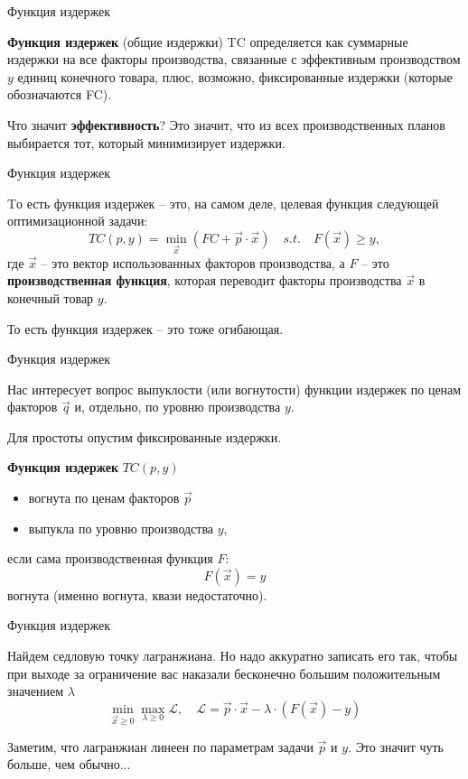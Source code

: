 \documentclass{beamer}
\begin{document}
\begin{frame}{Функция издержек}

\begin{definition}
\textbf{Функция издержек} (общие издержки) TC определяется как суммарные издержки на все факторы производства, связанные с эффективным производством $y$ единиц конечного товара, плюс, возможно, фиксированные издержки (которые обозначаются FC).
\end{definition}

Что значит \textbf{эффективность}? Это значит, что из всех производственных планов выбирается тот, который минимизирует издержки.
\end{frame}

\begin{frame}{Функция издержек}

Tо есть функция издержек – это, на самом деле, целевая функция следующей оптимизационной задачи:
$$ TC(p, y) = \min_{\vec x} ( FC + \vec p \cdot \vec x ) \quad s.t. \quad F(\vec x) \geqslant y,$$
где $\vec x$ – это вектор использованных факторов производства, а $F$ – это \textbf{производственная функция}, которая переводит факторы производства $\vec x$ в конечный товар $y$.

То есть функция издержек – это тоже огибающая.

\end{frame}

\begin{frame}{Функция издержек}

Нас интересует вопрос выпуклости (или вогнутости) функции издержек по ценам факторов $\vec q$ и, отдельно, по уровню производства $y$. 

Для простоты опустим фиксированные издержки.

\begin{lemma}
\textbf{Функция издержек} $TC(p,y)$
\begin{itemize}
\item вогнута по ценам факторов $\vec p$
\item выпукла по уровню производства $y$,
\end{itemize}

если сама производственная функция $F$:
$$
F(\vec x) = y
$$
вогнута (именно вогнута, квази недостаточно).
\end{lemma}

\end{frame}

\begin{frame}{Функция издержек}

Найдем седловую точку лагранжиана. Но надо аккуратно записать его так, чтобы при выходе за ограничение вас наказали бесконечно большим положительным значением $\lambda$
$$ \min_{\vec x \geqslant 0} \max_{\lambda \geqslant 0} \mathcal{L}, \quad \mathcal{L} = \vec p \cdot \vec x - \lambda \cdot (F(\vec x) - y)$$

Заметим, что лагранжиан линеен по параметрам задачи $\vec p$ и $y$. Это значит чуть больше, чем обычно...

\end{frame}
\end{document}

